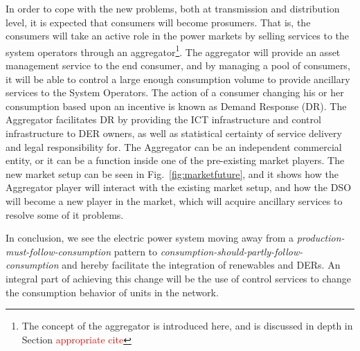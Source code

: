 In order to cope with the new problems, both at transmission and distribution level, it is expected that consumers will become prosumers. That is, the consumers will take an active role in the power markets by selling services to the system operators through an aggregator\footnote{The concept of the aggregator is introduced here, and is discussed in depth in Section \textcolor{red}{appropriate cite}}. The aggregator will provide an asset management service to the end consumer, and by managing a pool of consumers, it will be able to control a large enough consumption volume to provide ancillary services to the System Operators. The action of a consumer changing his or her consumption based upon an incentive is known as Demand Response (DR). The Aggregator facilitates DR by providing the ICT infrastructure and control infrastructure to DER owners, as well as statistical certainty of service delivery and legal responsibility for. The Aggregator can be an independent commercial entity, or it can be a function inside one of the pre-existing market players. The new market setup can be seen in Fig.~\ref{fig:marketfuture}, and it shows how the Aggregator player will interact with the existing market setup, and how the DSO will become a new player in the market, which will acquire ancillary services to resolve some of it problems.

In conclusion, we see the electric power system moving away from a \emph{production-must-follow-consumption} pattern to \emph{consumption-should-partly-follow-consumption} and hereby facilitate the integration of renewables and DERs. An integral part of achieving this change will be the use of control services to change the consumption behavior of units in the network.
